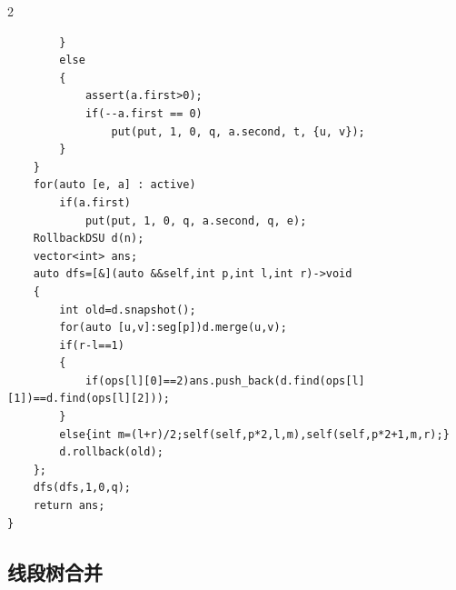 \documentclass[UTF8,fontset=fandol,a4paper,twoside]{ctexart}
\begin{document}
\begin{multicols}{2}
\begin{lstlisting}
        }
        else
        {
            assert(a.first>0);
            if(--a.first == 0)
                put(put, 1, 0, q, a.second, t, {u, v});
        }
    }
    for(auto [e, a] : active)
        if(a.first)
            put(put, 1, 0, q, a.second, q, e);
    RollbackDSU d(n);
    vector<int> ans;
    auto dfs=[&](auto &&self,int p,int l,int r)->void
    {
        int old=d.snapshot();
        for(auto [u,v]:seg[p])d.merge(u,v);
        if(r-l==1)
        {
            if(ops[l][0]==2)ans.push_back(d.find(ops[l][1])==d.find(ops[l][2]));
        }
        else{int m=(l+r)/2;self(self,p*2,l,m),self(self,p*2+1,m,r);}
        d.rollback(old);
    };
    dfs(dfs,1,0,q);
    return ans;
}
\end{lstlisting}
\subsection{线段树合并}


\end{multicols}
\end{document}
